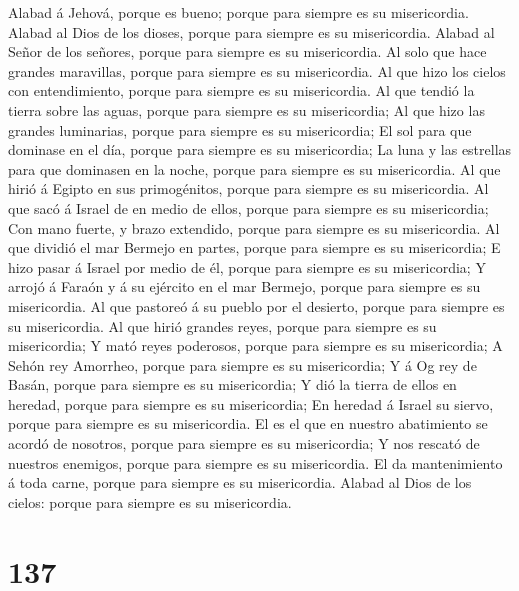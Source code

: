  Alabad á Jehová, porque es bueno; porque para siempre es
su misericordia.  Alabad al Dios de los dioses, porque
para siempre es su misericordia.  Alabad al Señor de los
señores, porque para siempre es su misericordia.  Al solo
que hace grandes maravillas, porque para siempre es su misericordia.
 Al que hizo los cielos con entendimiento, porque para
siempre es su misericordia.  Al que tendió la tierra sobre
las aguas, porque para siempre es su misericordia;  Al que
hizo las grandes luminarias, porque para siempre es su misericordia;
 El sol para que dominase en el día, porque para siempre
es su misericordia;  La luna y las estrellas para que
dominasen en la noche, porque para siempre es su misericordia.
 Al que hirió á Egipto en sus primogénitos, porque para
siempre es su misericordia.  Al que sacó á Israel de en
medio de ellos, porque para siempre es su misericordia; 
Con mano fuerte, y brazo extendido, porque para siempre es su
misericordia.  Al que dividió el mar Bermejo en partes,
porque para siempre es su misericordia;  E hizo pasar á
Israel por medio de él, porque para siempre es su misericordia;
 Y arrojó á Faraón y á su ejército en el mar Bermejo,
porque para siempre es su misericordia.  Al que pastoreó
á su pueblo por el desierto, porque para siempre es su misericordia.
 Al que hirió grandes reyes, porque para siempre es su
misericordia;  Y mató reyes poderosos, porque para
siempre es su misericordia;  A Sehón rey Amorrheo, porque
para siempre es su misericordia;  Y á Og rey de Basán,
porque para siempre es su misericordia;  Y dió la tierra
de ellos en heredad, porque para siempre es su misericordia;
 En heredad á Israel su siervo, porque para siempre es su
misericordia.  El es el que en nuestro abatimiento se
acordó de nosotros, porque para siempre es su misericordia;
 Y nos rescató de nuestros enemigos, porque para siempre
es su misericordia.  El da mantenimiento á toda carne,
porque para siempre es su misericordia.  Alabad al Dios
de los cielos: porque para siempre es su misericordia.

\hypertarget{section-136}{%
\section{137}\label{section-136}}


